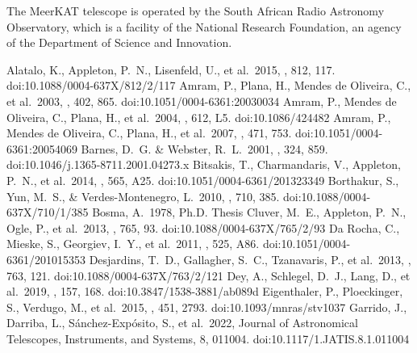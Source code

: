 \documentclass{aa}
\begin{document}
\begin{acknowledgements}
The MeerKAT telescope is operated by the South African Radio Astronomy Observatory, which is a facility of the National Research Foundation, an agency of the Department of Science and Innovation.
\end{acknowledgements}

\begin{thebibliography}{}
      Alatalo, K., Appleton, P.~N., Lisenfeld, U., et al.\ 2015, \apj, 812, 117. doi:10.1088/0004-637X/812/2/117
      Amram, P., Plana, H., Mendes de Oliveira, C., et al.\ 2003, \aap, 402, 865. doi:10.1051/0004-6361:20030034
      Amram, P., Mendes de Oliveira, C., Plana, H., et al.\ 2004, \apjl, 612, L5. doi:10.1086/424482
      Amram, P., Mendes de Oliveira, C., Plana, H., et al.\ 2007, \aap, 471, 753. doi:10.1051/0004-6361:20054069
      Barnes, D.~G. \& Webster, R.~L.\ 2001, \mnras, 324, 859. doi:10.1046/j.1365-8711.2001.04273.x
      Bitsakis, T., Charmandaris, V., Appleton, P.~N., et al.\ 2014, \aap, 565, A25. doi:10.1051/0004-6361/201323349
      Borthakur, S., Yun, M.~S., \& Verdes-Montenegro, L.\ 2010, \apj, 710, 385. doi:10.1088/0004-637X/710/1/385
      Bosma, A.\ 1978, Ph.D. Thesis
      Cluver, M.~E., Appleton, P.~N., Ogle, P., et al.\ 2013, \apj, 765, 93. doi:10.1088/0004-637X/765/2/93
      Da Rocha, C., Mieske, S., Georgiev, I.~Y., et al.\ 2011, \aap, 525, A86. doi:10.1051/0004-6361/201015353
      Desjardins, T.~D., Gallagher, S.~C., Tzanavaris, P., et al.\ 2013, \apj, 763, 121. doi:10.1088/0004-637X/763/2/121
      Dey, A., Schlegel, D.~J., Lang, D., et al.\ 2019, \aj, 157, 168. doi:10.3847/1538-3881/ab089d
      Eigenthaler, P., Ploeckinger, S., Verdugo, M., et al.\ 2015, \mnras, 451, 2793. doi:10.1093/mnras/stv1037
      Garrido, J., Darriba, L., S{\'a}nchez-Exp{\'o}sito, S., et al.\ 2022, Journal of Astronomical Telescopes, Instruments, and Systems, 8, 011004. doi:10.1117/1.JATIS.8.1.011004

\end{thebibliography}
\end{document}
